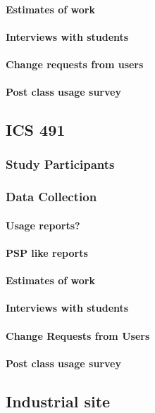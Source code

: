 \paragraph{Estimates of work}
\paragraph{Interviews with students}
\paragraph{Change requests from users}
\paragraph{Post class usage survey}

\subsection{ICS 491}
\subsubsection{Study Participants}
\subsubsection{Data Collection}
\paragraph{Usage reports?}
\paragraph{PSP like reports}
\paragraph{Estimates of work}
\paragraph{Interviews with students}
\paragraph{Change Requests from Users}
\paragraph{Post class usage survey}

\subsection{Industrial site}

